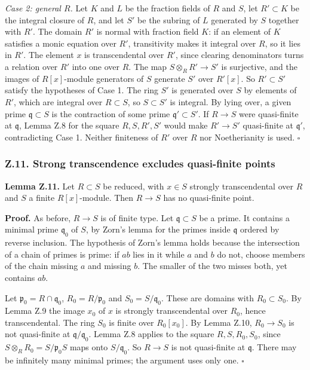 \documentclass[11pt]{article}
\begin{document}
\emph{Case 2: general \(R\).} Let \(K\) and \(L\) be the fraction fields
of \(R\) and \(S\), let \(R'\subset K\) be the integral closure of
\(R\), and let \(S'\) be the subring of \(L\) generated by \(S\)
together with \(R'\). The domain \(R'\) is normal with fraction field
\(K\): if an element of \(K\) satisfies a monic equation over \(R'\),
transitivity makes it integral over \(R\), so it lies in \(R'\). The
element \(x\) is transcendental over \(R'\), since clearing denominators
turns a relation over \(R'\) into one over \(R\). The map
\(S\otimes_RR'\to S'\) is surjective, and the images of \(R[x]\)-module
generators of \(S\) generate \(S'\) over \(R'[x]\). So \(R'\subset S'\)
satisfy the hypotheses of Case 1. The ring \(S'\) is generated over
\(S\) by elements of \(R'\), which are integral over \(R\subset S\), so
\(S\subset S'\) is integral. By lying over, a given prime
\(\mathfrak q\subset S\) is the contraction of some prime
\(\mathfrak q'\subset S'\). If \(R\to S\) were quasi-finite at
\(\mathfrak q\), Lemma Z.8 for the square \(R,S,R',S'\) would make
\(R'\to S'\) quasi-finite at \(\mathfrak q'\), contradicting Case 1.
Neither finiteness of \(R'\) over \(R\) nor Noetherianity is used.
\(\square\)

\subsubsection{Z.11. Strong transcendence excludes quasi-finite
points}\label{z.11.-strong-transcendence-excludes-quasi-finite-points}

\textbf{Lemma Z.11.} Let \(R\subset S\) be reduced, with \(x\in S\)
strongly transcendental over \(R\) and \(S\) a finite \(R[x]\)-module.
Then \(R\to S\) has no quasi-finite point.

\textbf{Proof.} As before, \(R\to S\) is of finite type. Let
\(\mathfrak q\subset S\) be a prime. It contains a minimal prime
\(\mathfrak q_0\) of \(S\), by Zorn's lemma for the primes inside
\(\mathfrak q\) ordered by reverse inclusion. The hypothesis of Zorn's
lemma holds because the intersection of a chain of primes is prime: if
\(ab\) lies in it while \(a\) and \(b\) do not, choose members of the
chain missing \(a\) and missing \(b\). The smaller of the two misses
both, yet contains \(ab\).

Let \(\mathfrak p_0=R\cap\mathfrak q_0\), \(R_0=R/\mathfrak p_0\) and
\(S_0=S/\mathfrak q_0\). These are domains with \(R_0\subset S_0\). By
Lemma Z.9 the image \(x_0\) of \(x\) is strongly transcendental over
\(R_0\), hence transcendental. The ring \(S_0\) is finite over
\(R_0[x_0]\). By Lemma Z.10, \(R_0\to S_0\) is not quasi-finite at
\(\mathfrak q/\mathfrak q_0\). Lemma Z.8 applies to the square
\(R,S,R_0,S_0\), since \(S\otimes_RR_0=S/\mathfrak p_0S\) maps onto
\(S/\mathfrak q_0\). So \(R\to S\) is not quasi-finite at
\(\mathfrak q\). There may be infinitely many minimal primes; the
argument uses only one. \(\square\)
\end{document}
